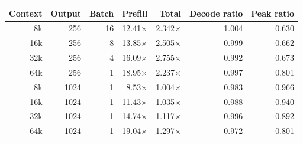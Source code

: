 \begin{tabular}{@{}rrrrrrr@{}}
\toprule
Context & Output & Batch & Prefill & Total & Decode ratio & Peak ratio \\
\midrule
8k & 256 & 16 & 12.41$\times$ & 2.342$\times$ & 1.004 & 0.630 \\
16k & 256 & 8 & 13.85$\times$ & 2.505$\times$ & 0.999 & 0.662 \\
32k & 256 & 4 & 16.09$\times$ & 2.755$\times$ & 0.992 & 0.673 \\
64k & 256 & 1 & 18.95$\times$ & 2.237$\times$ & 0.997 & 0.801 \\
8k & 1024 & 1 & 8.53$\times$ & 1.004$\times$ & 0.983 & 0.966 \\
16k & 1024 & 1 & 11.43$\times$ & 1.035$\times$ & 0.988 & 0.940 \\
32k & 1024 & 1 & 14.74$\times$ & 1.117$\times$ & 0.996 & 0.892 \\
64k & 1024 & 1 & 19.04$\times$ & 1.297$\times$ & 0.972 & 0.801 \\
\bottomrule
\end{tabular}
